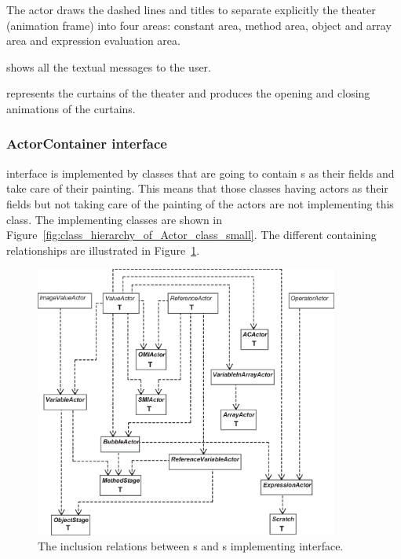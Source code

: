 The  actor draws the dashed lines and titles to separate explicitly the theater (animation frame) into four areas: constant area, method area, object and array area and expression evaluation area.

 shows all the textual messages to the user. 

 represents the curtains of the theater and produces the opening and closing animations of the curtains.

\subsubsection{ActorContainer interface}

 interface is implemented by classes that are going to contain s as their fields and take care of their painting. This means that those classes having actors as their fields but not taking care of the painting of the actors are not implementing this class. The implementing classes are shown in Figure~\ref{fig:class_hierarchy_of_Actor_class_small}. The different containing relationships are illustrated in Figure~\ref{fig:actors_and_actorcontainers}.

\begin{figure}[!htb]
\begin{center}
\includegraphics[width=10cm]{images/actorcontainers_and_actors.eps}
\caption{The inclusion relations between s and s implementing  interface.}
\label{fig:actors_and_actorcontainers}
\end{center}
\end{figure}

